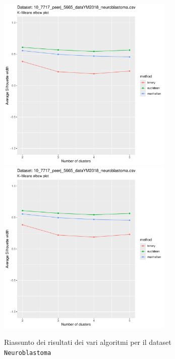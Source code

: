 \documentclass[a4paper, 12pt]{report}
\begin{document}
			\begin{figure}[H]
				\centering
				\includegraphics[width = 0.75\textwidth, height = 0.45\textheight, page = 9]{
					results/results_Neuroblastoma.csv.pdf
				}
				\includegraphics[width = 0.75\textwidth, height = 0.45\textheight, page = 10]{
					results/results_Neuroblastoma.csv.pdf
				}
				\caption{Riassunto dei risultati dei vari algoritmi per il dataset
				\texttt{Neuroblastoma}}
				\label{fig:comp3}
			\end{figure}
\end{document}
